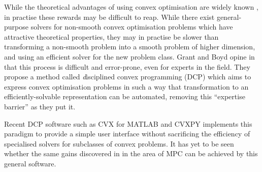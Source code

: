 While the theoretical advantages of using convex optimisation are widely known \cite{Luo06}, in practise these rewards may be difficult to reap.
While there exist general-purpose solvers for non-smooth convex optimisation problems which have attractive theoretical properties, they may in practise be slower than transforming a non-smooth problem into a smooth problem of higher dimension, and using an efficient solver for the new problem class.
Grant and Boyd opine in \cite{Grant08} that this process is difficult and error-prone, even for experts in the field.
They propose a method called {\emph disciplined convex programming} (DCP) \cite{Grant06} which aims to express convex optimisation problems in such a way that transformation to an efficiently-solvable representation can be automated, removing this ``expertise barrier'' as they put it.

Recent DCP software such as CVX for MATLAB \cite{CVX} and CVXPY \cite{CVXPY} implements this paradigm to provide a simple user interface without sacrificing the efficiency of specialised solvers for subclasses of convex problems.
{\opinion It has yet to be seen whether the same gains discovered in \cite{Wang10} in the area of MPC can be achieved by this general software.}
